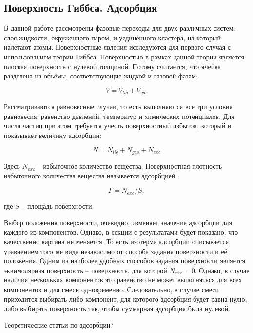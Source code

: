 \subsection{Поверхность Гиббса. Адсорбция}

В данной работе рассмотрены фазовые переходы для двух различных систем: слоя жидкости, окруженного паром, и уединенного кластера, на который налетают атомы. Поверхностные явления исследуются для первого случая с использованием теории Гиббса. Поверхностью в рамках данной теории является плоская поверхность с нулевой толщиной. Потому считается, что ячейка разделена на объёмы, соответствующие жидкой и газовой фазам:

\begin{equation}
    V = V_{liq} + V_{gas}
\end{equation}

Рассматриваются равновесные случаи, то есть выполняются все три условия равновесия: равенство давлений, температур и химических потенциалов. Для числа частиц при этом требуется учесть поверхностный избыток, который и показывает величину адсорбции:

\begin{equation}
    N = N_{liq} + N_{gas} + N_{exc}
\end{equation}

Здесь $N_{exc}$ \--- избыточное количество вещества. Поверхностная плотность избыточного количества вещества называется адсорбцией:

\begin{equation}
    \Gamma = N_{exc} / S,
\end{equation}

где $S$ \--- площадь поверхности.  

Выбор положения поверхности, очевидно, изменяет значение адсорбции для каждого из компонентов. Однако, в секции с результатами будет показано, что качественно картина не меняется. То есть изотерма адсорбции описывается уравнением того же вида независимо от способа задания поверхности и её положения. Одним из наиболее удобных способов задания поверхности является эквимолярная поверхность \--- поверхность, для которой $N_{exc} = 0$. Однако, в случае наличия нескольких компонентов это равенство не может выполняться для всех компонентов и для смеси одновременно. Следовательно, в случае смеси приходится выбирать либо компонент, для которого адсорбция будет равна нулю, либо выбирать поверхность так, чтобы суммарная адсорбция была нулевой.

Теоретические статьи по адсорбции? 

